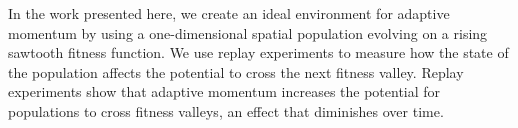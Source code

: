 In the work presented here, we create an ideal environment for adaptive momentum by using a one-dimensional spatial population evolving on a rising sawtooth fitness function.
We use replay experiments to measure how the state of the population affects the potential to cross the next fitness valley. 
Replay experiments show that %
adaptive momentum increases the potential for populations to cross fitness valleys, an effect that diminishes over time.

